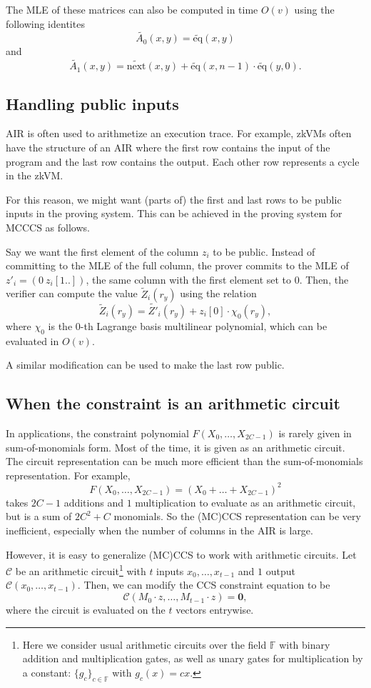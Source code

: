 \documentclass[a4paper]{article}
\begin{document}
The MLE of these matrices can also be computed in time $O(v)$ using the following identites
$$ \widetilde{A_0}(x,y) = \widetilde{\text{eq}}(x,y) $$
and
$$\widetilde{A_1}(x,y) = \widetilde{\text{next}}(x,y) + \widetilde{\text{eq}}(x,n-1)\cdot \widetilde{\text{eq}}(y,0).$$

\subsection*{Handling public inputs}

AIR is often used to arithmetize an execution trace. For example, zkVMs often have the structure of an AIR where the first row contains the input of the program and the last row contains the output. Each other row represents a cycle in the zkVM. 

For this reason, we might want (parts of) the first and last rows to be public inputs in the proving system. This can be achieved in the proving system for MCCCS as follows. 

Say we want the first element of the column $z_i$ to be public. Instead of committing to the MLE of the full column, the prover commits to the MLE of $z'_i = (0 \ z_i[1..])$, the same column with the first element set to 0. Then, the verifier can compute the value $\widetilde{Z}_i(r_y)$ using the relation
$$\widetilde{Z}_i(r_y) = \widetilde{Z'}_i(r_y) + z_i[0]\cdot \chi_0(r_y),$$
where $\chi_0$ is the 0-th Lagrange basis multilinear polynomial, which can be evaluated in $O(v)$. 

A similar modification can be used to make the last row public.

\subsection*{When the constraint is an arithmetic circuit}

In applications, the constraint polynomial $F(X_0,\dots, X_{2C-1})$ is rarely given in sum-of-monomials form. Most of the time, it is given as an arithmetic circuit. The circuit representation can be much more efficient than the sum-of-monomials representation. For example, 
$$ F(X_0,\dots, X_{2C-1}) = (X_0 + \dots + X_{2C-1})^2$$
takes $2C-1$ additions and $1$ multiplication to evaluate as an arithmetic circuit, but is a sum of $2C^2+C$ monomials. So the (MC)CCS representation can be very inefficient, especially when the number of columns in the AIR is large.

However, it is easy to generalize (MC)CCS to work with arithmetic circuits. Let $\mathcal{C}$ be an arithmetic circuit\footnote{Here we consider usual arithmetic circuits over the field $\mathbb{F}$ with binary addition and multiplication gates, as well as unary gates for multiplication by a constant: $\{g_c\}_{c\in \mathbb{F}}$ with $g_c(x) = cx$.} with $t$ inputs $x_0,\dots,x_{t-1}$ and $1$ output $\mathcal{C}(x_0,\dots,x_{t-1})$. Then, we can modify the CCS constraint equation to be
$$
\mathcal{C}(M_0\cdot z, \dots, M_{t-1}\cdot z) = \mathbf{0},
$$
where the circuit is evaluated on the $t$ vectors entrywise.
\end{document}

